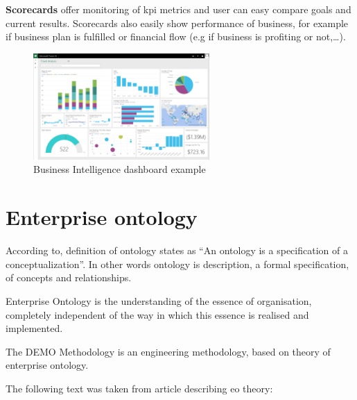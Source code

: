 \textbf{Scorecards} offer monitoring of \gls{kpi} metrics and user can easy compare goals and current results. Scorecards also easily show performance of business, for example if business plan is fulfilled or financial flow (e.g if business is profiting or not,\dots). 

\begin{figure}[ht!]
	\centering
    \includegraphics[width=0.6\textwidth]{img/microsoft-power-bi-dashboard.png}
    \caption{Business Intelligence dashboard example\cite{ms-business-intelligence-2018}}
    \label{fig:bi-dashboard}
\end{figure}

\section{Enterprise ontology}
According to\cite{gruber-translation-1993}, definition of ontology states as ``An ontology is a specification of a conceptualization''. In other words ontology is description, a formal specification, of concepts and relationships.

Enterprise Ontology\cite{dietz-essence-2015} is the understanding of the essence of organisation, completely independent of the way in which this essence is realised and implemented.

The DEMO Methodology\cite{dietz-enterprise-2006} is an engineering methodology, based on theory of enterprise ontology.

The following text was taken from article describing \gls{eo} theory\cite{haan-modeling-2009}:

